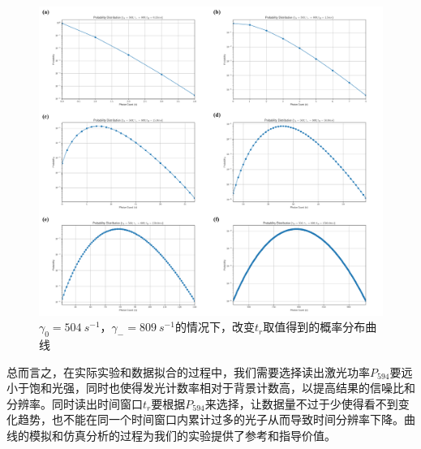 \documentclass[type = bachelor]{whu-thesis}
\begin{document}
\begin{figure}
  \centering
  \includegraphics[width=1.0\textwidth]{figures/Chapter 5/gamma_equ_tR_variation.png}
  \caption[$\gamma_0 = 504\ s^{-1}$，$\gamma_- = 809\ s^{-1}$的情况下，改变$t_r$取值得到的概率分布曲线]{$\gamma_0 = 504\ s^{-1}$，$\gamma_- = 809\ s^{-1}$的情况下，改变$t_r$取值得到的概率分布曲线}
  \label{fig: gamma_equ_tR_variation}
\end{figure}

总而言之，在实际实验和数据拟合的过程中，我们需要选择读出激光功率$P_{594}$要远小于饱和光强，同时也使得发光计数率相对于背景计数高，以提高结果的信噪比和分辨率。同时读出时间窗口$t_r$要根据$P_{594}$来选择，让数据量不过于少使得看不到变化趋势，也不能在同一个时间窗口内累计过多的光子从而导致时间分辨率下降。曲线的模拟和仿真分析的过程为我们的实验提供了参考和指导价值。
\end{document}
